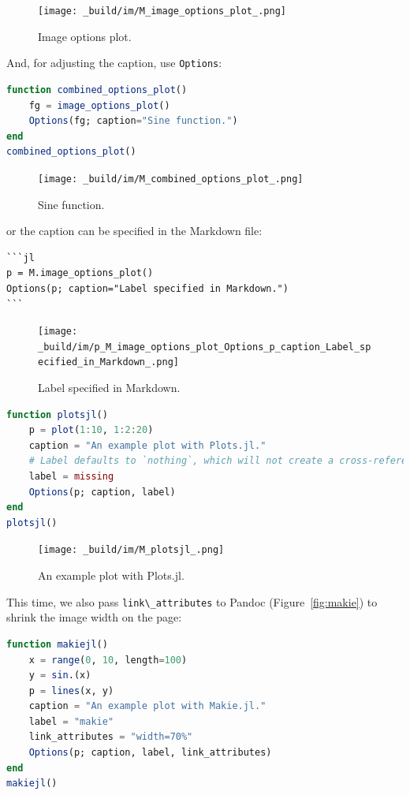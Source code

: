 \documentclass[
  notoc %
]{tufte-book}
\newcommand{\passthrough}[1]{#1}
\begin{document}
\begin{figure}
\hypertarget{fig:image_options_plot}{%
\centering
\texttt{[image: \_build/im/M\_image\_options\_plot\_.png]}
\caption{Image options plot.}\label{fig:image_options_plot}
}
\end{figure}

And, for adjusting the caption, use \passthrough{\lstinline!Options!}:

\begin{lstlisting}[language=Julia]
function combined_options_plot()
    fg = image_options_plot()
    Options(fg; caption="Sine function.")
end
combined_options_plot()
\end{lstlisting}

\begin{figure}
\centering
\texttt{[image: \_build/im/M\_combined\_options\_plot\_.png]}
\caption{Sine function.}
\end{figure}

or the caption can be specified in the Markdown file:

\begin{lstlisting}
```jl
p = M.image_options_plot()
Options(p; caption="Label specified in Markdown.")
```
\end{lstlisting}

\begin{figure}
\centering
\texttt{[image: \_build/im/p\_M\_image\_options\_plot\_Options\_p\_caption\_Label\_specified\_in\_Markdown\_.png]}
\caption{Label specified in Markdown.}
\end{figure}

\hfill\break

\begin{lstlisting}[language=Julia]
function plotsjl()
    p = plot(1:10, 1:2:20)
    caption = "An example plot with Plots.jl."
    # Label defaults to `nothing`, which will not create a cross-reference.
    label = missing
    Options(p; caption, label)
end
plotsjl()
\end{lstlisting}

\begin{figure}
\centering
\texttt{[image: \_build/im/M\_plotsjl\_.png]}
\caption{An example plot with Plots.jl.}
\end{figure}

This time, we also pass \passthrough{\lstinline!link\_attributes!} to
Pandoc (Figure~\ref{fig:makie}) to shrink the image width on the page:

\begin{lstlisting}[language=Julia]
function makiejl()
    x = range(0, 10, length=100)
    y = sin.(x)
    p = lines(x, y)
    caption = "An example plot with Makie.jl."
    label = "makie"
    link_attributes = "width=70%"
    Options(p; caption, label, link_attributes)
end
makiejl()
\end{lstlisting}
\end{document}
